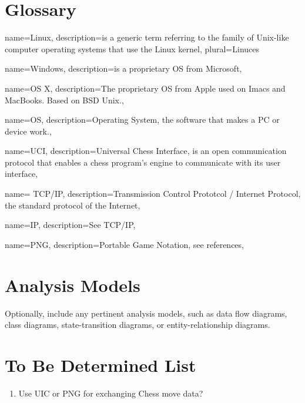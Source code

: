 \documentclass[a4paper,10pt]{article}
\begin{document}
\begin{appendices}
\section{Glossary}

{
  name=Linux,
  description={is a generic term referring to the family of Unix-like
               computer operating systems that use the Linux kernel},
  plural=Linuces
}

{
  name=Windows, 
  description={is a proprietary OS  from Microsoft\textregistered},
}

{
  name=OS X,
  description={The proprietary OS from Apple\textregistered{} used on Imacs\textregistered{}  and MacBooks\textregistered. Based on  BSD Unix.},
}

{
  name=OS,
  description={Operating System, the software that makes a PC or device work.},
}

{
  name=UCI,
  description={Universal Chess Interface, is an open communication protocol that enables a chess program's engine to communicate with its user interface},
}

{
  name= TCP/IP,
  description={Transmission Control Prototcol / Internet Protocol, the standard protocol of the Internet},
}

{
  name=IP,
  description={See TCP/IP},
}


{
  name=PNG,
  description={Portable Game Notation, see references},
}




\printglossaries
\glsaddall


\section{Analysis Models}

Optionally, include any pertinent analysis models, such as data flow diagrams, class diagrams, state-transition diagrams, or entity-relationship diagrams.
\section{To Be Determined List \label{TBDList}}
\begin{enumerate}
  \item Use UIC or PNG for exchanging Chess move data?
\end{enumerate}




\clearpage
\pagebreak
{}


\end{appendices}
\end{document}
